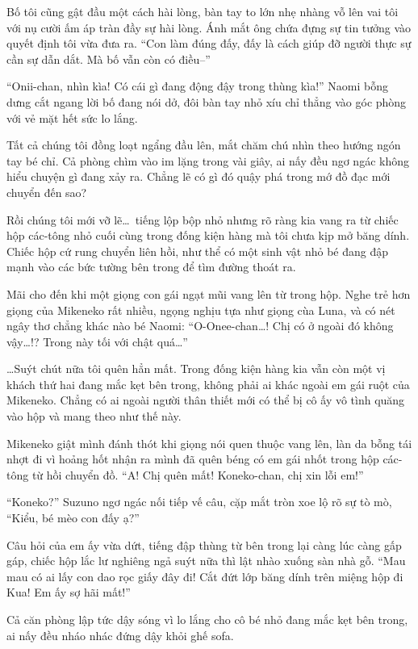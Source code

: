 ﻿\documentclass[../main.tex]{subfiles}
\begin{document}
Bố tôi cũng gật đầu một cách hài lòng, bàn tay to lớn nhẹ nhàng vỗ lên vai tôi với nụ cười ấm áp tràn đầy sự hài lòng. Ánh mắt ông chứa đựng sự tin tưởng vào quyết định tôi vừa đưa ra. ``Con làm đúng đấy, đấy là cách giúp đỡ người thực sự cần sự dẫn dắt. Mà bố vẫn còn có điều--''

``Onii-chan, nhìn kìa! Có cái gì đang động đậy trong thùng kìa!'' Naomi bỗng dưng cắt ngang lời bố đang nói dở, đôi bàn tay nhỏ xíu chỉ thẳng vào góc phòng với vẻ mặt hết sức lo lắng.

Tất cả chúng tôi đồng loạt ngẩng đầu lên, mắt chăm chú nhìn theo hướng ngón tay bé chỉ. Cả phòng chìm vào im lặng trong vài giây, ai nấy đều ngơ ngác không hiểu chuyện gì đang xảy ra. Chẳng lẽ có gì đó quậy phá trong mớ đồ đạc mới chuyển đến sao?

Rồi chúng tôi mới vỡ lẽ\dots\ tiếng lộp bộp nhỏ nhưng rõ ràng kia vang ra từ chiếc hộp các-tông nhỏ cuối cùng trong đống kiện hàng mà tôi chưa kịp mở băng dính. Chiếc hộp cứ rung chuyển liên hồi, như thể có một sinh vật nhỏ bé đang đập mạnh vào các bức tường bên trong để tìm đường thoát ra.

Mãi cho đến khi một giọng con gái ngạt mũi vang lên từ trong hộp. Nghe trẻ hơn giọng của Mikeneko rất nhiều, ngọng nghịu tựa như giọng cùa Luna, và có nét ngây thơ chẳng khác nào bé Naomi: ``O-Onee-chan\dots! Chị có ở ngoài đó không vậy\dots!? Trong này tối với chật quá\dots''

\dots Suýt chút nữa tôi quên hẳn mất. Trong đống kiện hàng kia vẫn còn một vị khách thứ hai đang mắc kẹt bên trong, không phải ai khác ngoài em gái ruột của Mikeneko. Chẳng có ai ngoài người thân thiết mới có thể bị cô ấy vô tình quăng vào hộp và mang theo như thế này.

Mikeneko giật mình đánh thót khi giọng nói quen thuộc vang lên, làn da bỗng tái nhợt đi vì hoảng hốt nhận ra mình đã quên béng có em gái nhốt trong hộp các-tông từ hồi chuyển đồ. ``A! Chị quên mất! Koneko-chan, chị xin lỗi em!''

``Koneko?'' Suzuno ngơ ngác nối tiếp vế câu, cặp mắt tròn xoe lộ rõ sự tò mò, ``Kiểu, bé mèo con đấy ạ?''

Câu hỏi của em ấy vừa dứt, tiếng đập thùng từ bên trong lại càng lúc càng gấp gáp, chiếc hộp lắc lư nghiêng ngả suýt nữa thì lật nhào xuống sàn nhà gỗ. ``Mau mau có ai lấy con dao rọc giấy đây đi! Cắt đứt lớp băng dính trên miệng hộp đi Kua! Em ấy sợ hãi mất!''

Cả căn phòng lập tức dậy sóng vì lo lắng cho cô bé nhỏ đang mắc kẹt bên trong, ai nấy đều nháo nhác đứng dậy khỏi ghế sofa.
\end{document}
